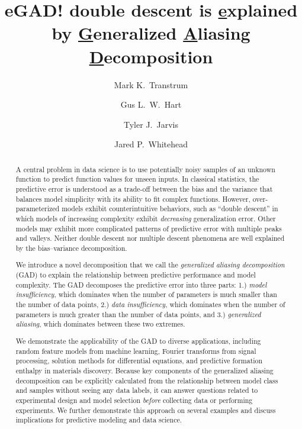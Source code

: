 \documentclass[twocolumn,aps,prx,superscriptaddress,10pt]{revtex4-2}
\newcommand{\0}{\bm{0}}
\begin{document}
\title{eGAD! double descent is \underline{e}xplained by \underline{G}eneralized \underline{A}liasing \underline{D}ecomposition    }

\author{Mark K.~Transtrum}
\author{Gus L.~W.~Hart}
\author{Tyler J.~Jarvis}
\author{Jared P.~Whitehead}


\begin{abstract}

A central problem in data science is to use potentially noisy samples of an unknown function to predict function values for unseen inputs.
In classical statistics, the predictive error is understood as a trade-off between the bias and the variance that balances model simplicity with its ability to fit complex functions.
However, over-parameterized models exhibit counterintuitive behaviors, such as ``double descent'' in which models of increasing complexity exhibit \emph{decreasing} generalization error.  
Other models may exhibit more complicated patterns of predictive error with multiple peaks and valleys. 
Neither double descent nor multiple descent phenomena are well explained by the bias--variance decomposition.

We introduce a novel decomposition that we call the \emph{generalized aliasing decomposition} (GAD) to explain the relationship between predictive performance and model complexity.
The GAD decomposes the predictive error into three parts: 1.) \emph{model insufficiency}, which dominates when the number of parameters is much smaller than the number of data points, 2.) \emph{data insufficiency}, which dominates when the number of parameters is much greater than the number of data points, and 3.) \emph{generalized aliasing}, which dominates between these two extremes.

We demonstrate the applicability of the GAD to diverse applications, including random feature models from machine learning, Fourier transforms from signal processing, solution methods for differential equations, and predictive formation enthalpy in materials discovery. 
Because key components of the generalized aliasing decomposition can be explicitly calculated from the relationship between model class and samples without seeing any data labels, it can answer questions related to experimental design and model selection \emph{before} collecting data or performing experiments.
We further demonstrate this approach on several examples and discuss implications for predictive modeling and data science.
\end{abstract}
\end{document}
